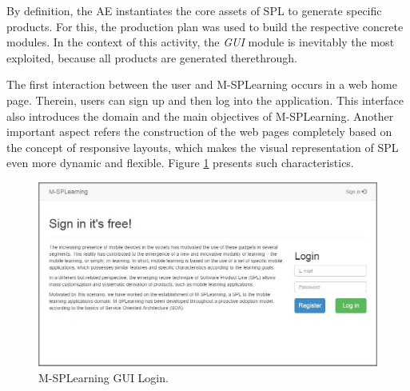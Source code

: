 By definition, the AE instantiates the core assets of SPL to generate specific products. For this, the production plan was used to build the respective concrete modules. In the context of this activity, the \textit{GUI} module is inevitably the most exploited, because all products are generated therethrough.

The first interaction between the user and M-SPLearning occurs in a web home page. Therein, users can sign up and then log into the application. This interface also introduces the domain and the main objectives of M-SPLearning. Another important aspect refers the construction of the web pages completely based on the concept of responsive layouts, which makes the visual representation of SPL even more dynamic and flexible. Figure \ref{figureMSPLWebLogin} presents such characteristics.

\begin{figure}
\centering
\includegraphics[scale=0.4]{figures/section3/MSPLWebLogin}
\caption{M-SPLearning GUI Login.}
\label{figureMSPLWebLogin}
\end{figure}

